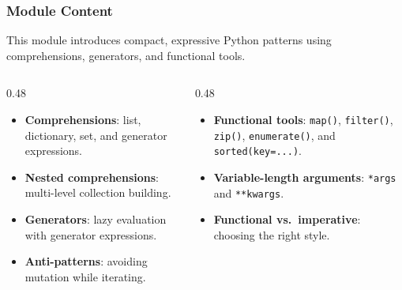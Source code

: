 \documentclass[aspectratio=169,10pt]{beamer}
\newcommand{\keyword}[1]{\textcolor{PrimaryBlue}{\textbf{#1}}}
\newcommand{\codeword}[1]{\texttt{#1}}
\begin{document}
\begin{frame}
\frametitle{Module Content}
\small
This module introduces compact, expressive Python patterns using comprehensions, generators, and functional tools.

\vspace{0.16cm}
\begin{columns}[T,totalwidth=0.96\textwidth]
\begin{column}{0.48\textwidth}
\begin{itemize}\setlength\itemsep{0.08cm}
  \item \keyword{Comprehensions}: list, dictionary, set, and generator expressions.
  \item \keyword{Nested comprehensions}: multi-level collection building.
  \item \keyword{Generators}: lazy evaluation with generator expressions.
  \item \keyword{Anti-patterns}: avoiding mutation while iterating.
\end{itemize}
\end{column}
\begin{column}{0.48\textwidth}
\begin{itemize}\setlength\itemsep{0.08cm}
  \item \keyword{Functional tools}: \codeword{map()}, \codeword{filter()}, \codeword{zip()}, \codeword{enumerate()}, and \codeword{sorted(key=...)}.
  \item \keyword{Variable-length arguments}: \codeword{*args} and \codeword{**kwargs}.
  \item \keyword{Functional vs.\ imperative}: choosing the right style.
\end{itemize}
\end{column}
\end{columns}
\end{frame}
\end{document}
